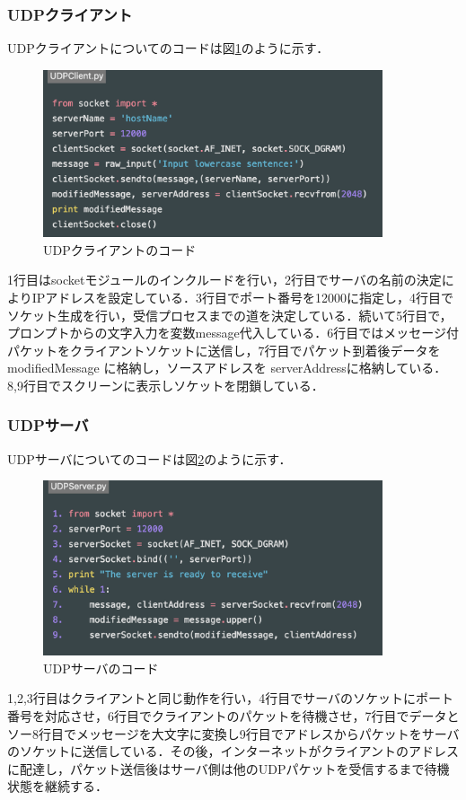 \documentclass[9pt,a4j,twocolumn]{jsarticle}
\begin{document}
\subsubsection{UDPクライアント}
UDPクライアントについてのコードは図\ref{fig:udp_client}のように示す．
\begin{figure}[tb]
\includegraphics[width=10cm]{UDPClient.png}
 \caption{UDPクライアントのコード}
 \label{fig:udp_client}
\end{figure}
1行目はsocketモジュールのインクルードを行い，2行目でサーバの名前の決定によりIPアドレスを設定している．3行目でポート番号を12000に指定し，4行目でソケット生成を行い，受信プロセスまでの道を決定している．続いて5行目で，プロンプトからの文字入力を変数message代入している．6行目ではメッセージ付パケットをクライアントソケットに送信し，7行目でパケット到着後データを modifiedMessage に格納し，ソースアドレスを serverAddressに格納している．8,9行目でスクリーンに表示しソケットを閉鎖している．\\
\subsubsection{UDPサーバ}
UDPサーバについてのコードは図\ref{fig:udp_server}のように示す．
\begin{figure}[tb]
\includegraphics[width=10cm]{UDPServer.png}
 \caption{UDPサーバのコード}
 \label{fig:udp_server}
\end{figure}
1,2,3行目はクライアントと同じ動作を行い，4行目でサーバのソケットにポート番号を対応させ，6行目でクライアントのパケットを待機させ，7行目でデータとソー8行目でメッセージを大文字に変換し9行目でアドレスからパケットをサーバのソケットに送信している．その後，インターネットがクライアントのアドレスに配達し，パケット送信後はサーバ側は他のUDPパケットを受信するまで待機状態を継続する．\\
\end{document}
